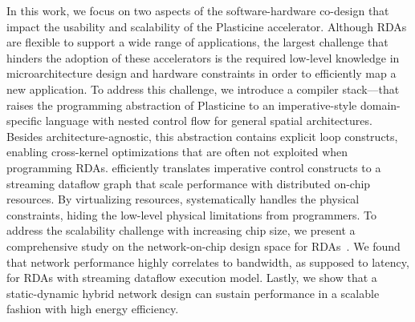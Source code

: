 In this work, we focus on two aspects of the software-hardware co-design that impact the usability
and scalability of the Plasticine accelerator. 
Although RDAs are flexible to support a wide range of applications, 
the largest challenge that hinders the adoption of these accelerators is 
the required low-level knowledge in microarchitecture design and hardware constraints in
order to efficiently map a new application.
To address this challenge, we introduce a compiler stack--\name--that raises the programming abstraction of
Plasticine to an imperative-style domain-specific language with nested control
flow for general spatial architectures.
Besides architecture-agnostic, this abstraction contains explicit loop constructs, enabling
cross-kernel optimizations that are often not exploited when programming RDAs.
\name efficiently translates imperative control constructs to a streaming
dataflow graph that scale performance with distributed on-chip resources.
By virtualizing resources, \name systematically handles the physical constraints, hiding
the low-level physical limitations from programmers.
To address the scalability challenge with increasing chip size, 
we present a comprehensive study on the network-on-chip design space for RDAs~\cite{network}.
We found that network performance highly correlates to bandwidth, as supposed to latency,
for RDAs with streaming dataflow execution model.
Lastly, we show that a static-dynamic hybrid network design can sustain performance in a 
scalable fashion with high energy efficiency.
